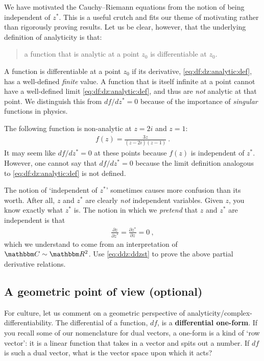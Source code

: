 We have motivated the Cauchy--Riemann equations from the notion of being independent of $z^*$. This is a useful crutch and fits our theme of motivating rather than rigorously proving results. Let us be clear, however, that the underlying definition of analyticity is that:
\begin{quote}
a function that is analytic at a point $z_0$ is differentiable at $z_0$.
\end{quote}
A function is differentiable at a point $z_0$ if its derivative, \eqref{eq:df:dz:analytic:def}, has a well-defined \emph{finite} value. A function that is itself infinite at a point cannot have a well-defined limit \eqref{eq:df:dz:analytic:def}, and thus are \emph{not} analytic at that point.
We distinguish this from $df/dz^*=0$ because of the importance of \emph{singular} functions in physics. 
\begin{example}
The following function is non-analytic at $z=2i$ and $z=1$:
\begin{align}
	f(z) = \frac{3z}{(z-2i)(z-1)} \ .
\end{align}
It may seem like $df/dz^* = 0$ at these points because $f(z)$ is independent of $z^*$. However, one cannot say that $df/dz^*=0$ because the limit definition analogous to \eqref{eq:df:dz:analytic:def} is not defined. 
\end{example}
\begin{exercise}
The notion of `independent of $z^*$' sometimes causes more confusion than its worth. After all, $z$ and $z^*$ are clearly \emph{not} independent variables. Given $z$, you know exactly what $z^*$ is. The notion in which we \emph{pretend} that $z$ and $z^*$ are independent is that
\begin{align}
	\frac{\partial z}{\partial z^*} = 
	\frac{\partial z^*}{\partial z} = 0 \ ,
\end{align}
which we understand to come from an interpretation of $\mathbbm C \sim \mathbbm R^2$. Use \eqref{eq:ddz:ddzst} to prove the above partial derivative relations.
\end{exercise}



\subsection{A geometric point of view (optional)}
\label{sec:analytic:geometric}

For culture, let us comment on a geometric perspective of analyticity/complex-differentiability. The differential of a function, $df$, is a \textbf{differential one-form}. If you recall some of our nomenclature for dual vectors, a one-form is a kind of `row vector': it is a linear function that takes in a vector and spits out a number. If $df$ is such a dual vector, what is the vector space upon which it acts?

